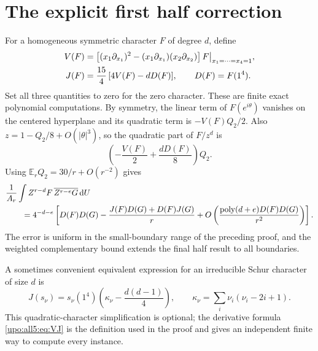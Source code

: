 \documentclass[11pt,letterpaper]{article}
\theoremstyle{remark}\newtheorem{remark}[theorem]{Remark}
\numberwithin{equation}{section}
\newcommand{\E}{\mathbb E}
\newcommand{\dd}{\,\mathrm d}
\begin{document}
\section{The explicit first half correction}\label{upo:all5:sec:first}
For a homogeneous symmetric character $F$ of degree $d$, define
\begin{align}\label{upo:all5:eq:VJ}
 V(F)&=\left[
 (x_1\partial_{x_1})^2-(x_1\partial_{x_1})(x_2\partial_{x_2})
                      \right]F\big|_{x_1=\cdots=x_4=1},\notag\\
 J(F)&=\frac{15}{4}\,[4V(F)-dD(F)],\qquad D(F)=F(1^4).
\end{align}
Set all three quantities to zero for the zero character. These are
finite exact polynomial computations. By symmetry, the linear term
of $F(e^{i\theta})$ vanishes on the centered hyperplane and its
quadratic term is $-V(F)Q_2/2$. Also $z=1-Q_2/8+O(|\theta|^3)$,
so the quadratic part of $F/z^d$ is
\begin{equation}\label{upo:all5:eq:quadquot}
 \left(-\frac{V(F)}2+\frac{dD(F)}8\right)Q_2.
\end{equation}
Using $\E_rQ_2=30/r+O(r^{-2})$ gives
\begin{align}\label{upo:all5:eq:characterfirst}
 &\frac1{A_r}\int Z^{r-d}F\,\overline{Z^{r-e}G}\dd U\notag\\
 &\qquad=4^{-d-e}\left[
 D(F)D(G)-\frac{J(F)D(G)+D(F)J(G)}{r}
                +O\left(\frac{\operatorname{poly}(d+e)D(F)D(G)}{r^2}\right)
                          \right].
\end{align}
The error is uniform in the small-boundary range of the preceding
proof, and the weighted complementary bound extends the final half
result to all boundaries.

A sometimes convenient equivalent expression for an irreducible
Schur character of size $d$ is
\begin{equation}\label{upo:all5:eq:casimir}
 J(s_\nu)=s_\nu(1^4)
  \left(\kappa_\nu-\frac{d(d-1)}4\right),\qquad
 \kappa_\nu=\sum_i\nu_i(\nu_i-2i+1).
\end{equation}
This quadratic-character simplification is optional; the derivative
formula \eqref{upo:all5:eq:VJ} is the definition used in the proof and gives
an independent finite way to compute every instance.
\end{document}
